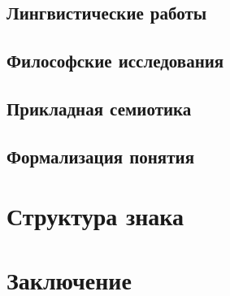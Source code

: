 \documentclass[a4paper,12pt]{article}
\begin{document}
	\subsection{Лингвистические работы}
	
	\subsection{Философские исследования}
	
	\subsection{Прикладная семиотика}
	
	\subsection{Формализация понятия}
	
	\section{Структура знака}
	\section*{Заключение}
	
   \printbibliography
\end{document}
